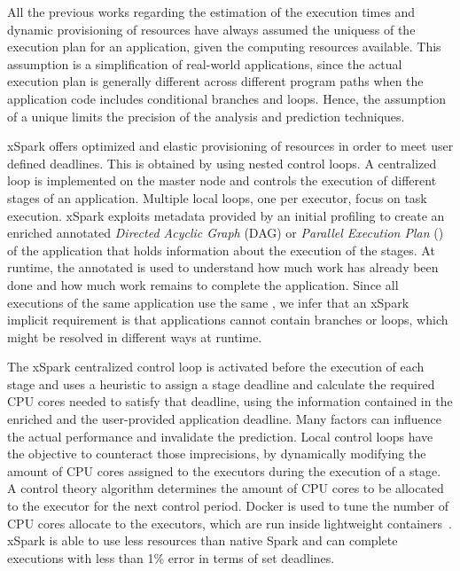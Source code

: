 All the previous works regarding the estimation of the execution times and dynamic provisioning of resources have always assumed the uniquess of the execution plan for an application, given the computing resources available. This assumption is a simplification of real-world applications, since the actual execution plan is generally different across different program paths when the application code includes conditional branches and loops. Hence, the assumption of a unique \plan limits the precision of the analysis and prediction techniques.

xSpark offers optimized and elastic provisioning of resources in order to meet user defined deadlines. This is obtained by using nested control loops. A centralized loop is implemented on the master node and controls the execution of different stages of an application. Multiple local loops, one per executor, focus on task execution. xSpark exploits metadata provided by an initial profiling to create an enriched annotated \textit{Directed Acyclic Graph} (DAG) or \textit{Parallel Execution Plan} (\plan) of the application that holds information about the execution of the stages. At runtime, the annotated \plan is used to understand how much work has already been done and how much work remains to complete the application. Since all executions of the same application use the same \plan, we infer that an xSpark implicit requirement is that applications cannot contain branches or loops, which might be resolved in different ways at runtime. 

The xSpark centralized control loop is activated before the execution of each stage and uses a heuristic to assign a stage deadline and calculate the required CPU cores needed to satisfy that deadline, using the information contained in the enriched \plan and the user-provided  application deadline. Many factors can influence the actual performance and invalidate the prediction. Local control loops have the objective to counteract those imprecisions, by dynamically modifying the amount of CPU cores assigned to the executors during the execution of a stage. A control theory algorithm determines the amount of CPU cores to be allocated to the executor for the next control period. Docker is used to tune the number of CPU cores allocate to the executors, which are run inside lightweight containers~\cite{misc:Docker}. xSpark is able to use less resources than native Spark and can complete executions with less than 1\% error in terms of set deadlines.


